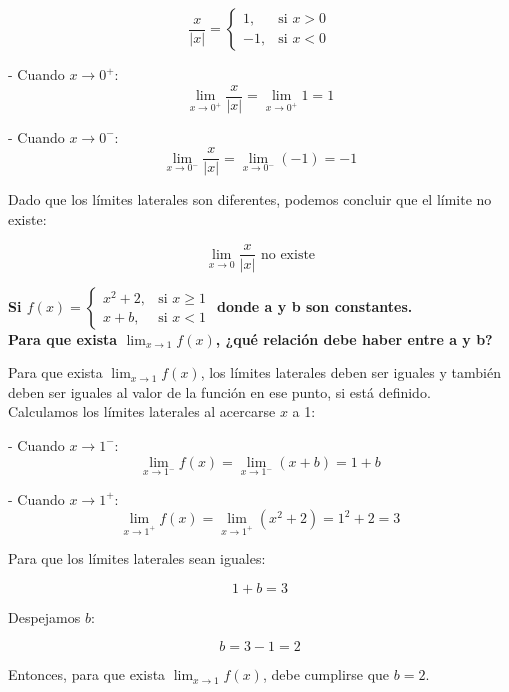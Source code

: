 \documentclass[answers]{exam} %
\begin{document}
\begin{questions}
\begin{solution}
		\[
			\frac{x}{|x|} =
			\begin{cases}
				1,  & \text{si } x > 0 \\
				-1, & \text{si } x < 0
			\end{cases}
		\]

		- Cuando \( x \to 0^+ \):
		\[
			\lim_{x \to 0^+} \frac{x}{|x|} = \lim_{x \to 0^+} 1 = 1
		\]

		- Cuando \( x \to 0^- \):
		\[
			\lim_{x \to 0^-} \frac{x}{|x|} = \lim_{x \to 0^-} (-1) = -1
		\]

		Dado que los límites laterales son diferentes, podemos concluir que el límite no existe:

		\[
			\lim_{x \to 0} \frac{x}{|x|} \text{ no existe}
		\]
	\end{solution}


	\vspace{0.5cm}

	\question \large\textbf{Si $ f(x) =
			\begin{cases}
				x^2+2, & \text{si } x \geq 1 \\
				x+b,   & \text{si } x < 1
			\end{cases}
		$ donde a y b son constantes. \\[1em] Para que exista $\displaystyle \lim_{x\to{1}} f(x)$, ¿qué relación debe haber entre a y b?}
	\begin{solution}
		Para que exista $\displaystyle \lim_{x\to{1}} f(x)$, los límites laterales deben ser iguales y también deben ser iguales al valor de la función en ese punto, si está definido. \\[1em]
		Calculamos los límites laterales al acercarse \(x\) a 1:

		- Cuando \( x \to 1^- \):
		\[
			\lim_{x \to 1^-} f(x) = \lim_{x \to 1^-} (x + b) = 1 + b
		\]

		- Cuando \( x \to 1^+ \):
		\[
			\lim_{x \to 1^+} f(x) = \lim_{x \to 1^+} (x^2 + 2) = 1^2 + 2 = 3
		\]

		Para que los límites laterales sean iguales:

		\[
			1 + b = 3
		\]

		Despejamos \(b\):

		\[
			b = 3 - 1 = 2
		\]

		Entonces, para que exista $\displaystyle \lim_{x\to{1}} f(x)$, debe cumplirse que \( b = 2 \).
		\vspace{0.5cm}
	\end{solution}


	\vspace{0.5cm}


\end{questions}
\end{document}
